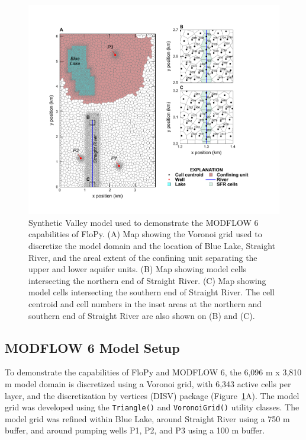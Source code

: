 \documentclass[12pt, oneside]{article}  	%
\begin{document}
\begin{figure}[ht!]
	\begin{center}
		\includegraphics{figures/mv_voronoi_river_discretization.pdf}
	\end{center}
	\caption{Synthetic Valley model used to demonstrate the MODFLOW 6 capabilities of FloPy. (A) Map showing the Voronoi grid used to discretize the model domain and the location of Blue Lake, Straight River, and the areal extent of the confining unit separating the upper and lower aquifer units. (B) Map showing model cells intersecting the northern end of Straight River. (C) Map showing model cells intersecting the southern end of Straight River. The cell centroid and cell numbers in the inset areas at the northern and southern end of Straight River are also shown on (B) and (C).}
	\label{fig:mvgrid}
\end{figure}

\subsection*{MODFLOW 6 Model Setup}

To demonstrate the capabilities of FloPy and MODFLOW 6, the 6,096 m x 3,810 m model domain is discretized using a Voronoi grid, with 6,343 active cells per layer, and the discretization by vertices (DISV) package (Figure~\ref{fig:mvgrid}A). The model grid was developed using the \texttt{Triangle()} and \texttt{VoronoiGrid()} utility classes. The model grid was refined within Blue Lake, around Straight River using a 750 m buffer, and around pumping wells P1, P2, and P3 using a 100 m buffer.
\end{document}
